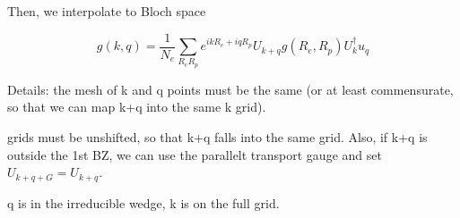 \documentclass[singlecolumn,english,aps,prl,showpacs,floatfix,superscriptaddress,notitlepage]{revtex4-1}
\begin{document}
Then, we interpolate to Bloch space

\begin{equation}
g(k,q)
=
\frac{1}{N_e}
\sum_{R_e R_p} e^{ikR_e+iqR_p} U_{k+q} g(R_e,R_p) U_k^\dagger u_q
\end{equation}


Details:
the mesh of k and q points must be the same (or at least commensurate, so that we can map k+q into the same k grid).

grids must be unshifted, so that k+q falls into the same grid.
Also, if k+q is outside the 1st BZ, we can use the parallelt transport gauge and set $U_{k+q+G} = U_{k+q}$.

q is in the irreducible wedge, k is on the full grid.
\end{document}
